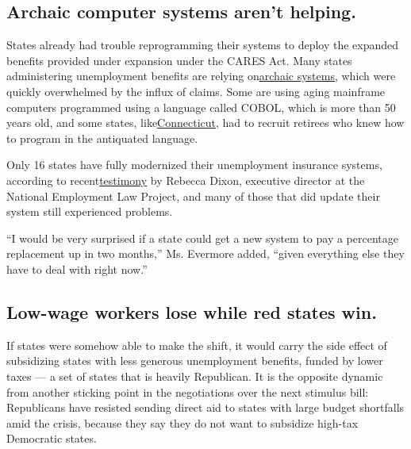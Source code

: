 \hypertarget{archaic-computer-systems-arent-helping}{%
\subsection{Archaic computer systems aren't
helping.}\label{archaic-computer-systems-arent-helping}}

States already had trouble reprogramming their systems to deploy the
expanded benefits provided under expansion under the CARES Act. Many
states administering unemployment benefits are relying
on\href{https://www.nytimes3xbfgragh.onion/2020/04/17/nyregion/coronavirus-pandemic-unemployment-assistance-ny-delays.html}{archaic
systems}, which were quickly overwhelmed by the influx of claims. Some
are using aging mainframe computers programmed using a language called
COBOL, which is more than 50 years old, and some states,
like\href{https://www.nytimes3xbfgragh.onion/2020/04/04/nyregion/coronavirus-ny-unemployment-benefits.html}{Connecticut},
had to recruit retirees who knew how to program in the antiquated
language.

Only 16 states have fully modernized their unemployment insurance
systems, according to
recent\href{https://www.nelp.org/publication/from-disrepair-to-transformation-how-to-revive-unemployment-insurance-information-technology-infrastructure/}{testimony}
by Rebecca Dixon, executive director at the National Employment Law
Project, and many of those that did update their system still
experienced problems.

``I would be very surprised if a state could get a new system to pay a
percentage replacement up in two months,'' Ms. Evermore added, ``given
everything else they have to deal with right now.''

\hypertarget{low-wage-workers-lose-while-red-states-win}{%
\subsection{Low-wage workers lose while red states
win.}\label{low-wage-workers-lose-while-red-states-win}}

If states were somehow able to make the shift, it would carry the side
effect of subsidizing states with less generous unemployment benefits,
funded by lower taxes --- a set of states that is heavily Republican. It
is the opposite dynamic from another sticking point in the negotiations
over the next stimulus bill: Republicans have resisted sending direct
aid to states with large budget shortfalls amid the crisis, because they
say they do not want to subsidize high-tax Democratic states.

